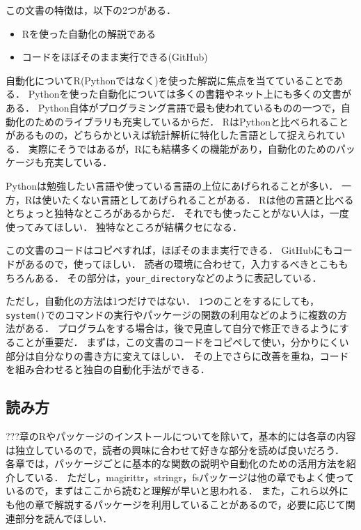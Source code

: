 \documentclass[
]{article}
\providecommand{\tightlist}{%
  \setlength{\itemsep}{0pt}\setlength{\parskip}{0pt}}
\begin{document}
この文書の特徴は，以下の2つがある．

\begin{itemize}
\tightlist
\item
  Rを使った自動化の解説である\\
\item
  コードをほぼそのまま実行できる(GitHub)
\end{itemize}

自動化についてR(Pythonではなく)を使った解説に焦点を当てていることである．
Pythonを使った自動化については多くの書籍やネット上にも多くの文書がある．
Python自体がプログラミング言語で最も使われているものの一つで，自動化のためのライブラリも充実しているからだ．
RはPythonと比べられることがあるものの，どちらかといえば統計解析に特化した言語として捉えられている．
実際にそうではあるが，Rにも結構多くの機能があり，自動化のためのパッケージも充実している．

Pythonは勉強したい言語や使っている言語の上位にあげられることが多い．
一方，Rは使いたくない言語としてあげられることがある．
Rは他の言語と比べるとちょっと独特なところがあるからだ．
それでも使ったことがない人は，一度使ってみてほしい．
独特なところが結構クセになる．

この文書のコードはコピペすれば，ほぼそのまま実行できる．
GitHubにもコードがあるので，使ってほしい．
読者の環境に合わせて，入力するべきとこももちろんある．
その部分は，\texttt{your\_directory}などのように表記している．

ただし，自動化の方法は1つだけではない．
1つのことをするにしても，\texttt{system()}でのコマンドの実行やパッケージの関数の利用などのように複数の方法がある．
プログラムをする場合は，後で見直して自分で修正できるようにすることが重要だ．
まずは，この文書のコードをコピペして使い，分かりにくい部分は自分なりの書き方に変えてほしい．
その上でさらに改善を重ね，コードを組み合わせると独自の自動化手法ができる．

\hypertarget{ux8aadux307fux65b9}{%
\subsection{読み方}\label{ux8aadux307fux65b9}}

???章のRやパッケージのインストールについてを除いて，基本的には各章の内容は独立しているので，読者の興味に合わせて好きな部分を読めば良いだろう．
各章では，パッケージごとに基本的な関数の説明や自動化のための活用方法を紹介している．
ただし，magirittr，stringr，fsパッケージは他の章でもよく使っているので，まずはここから読むと理解が早いと思われる．
また，これら以外にも他の章で解説するパッケージを利用していることがあるので，必要に応じて関連部分を読んでほしい．
\end{document}
